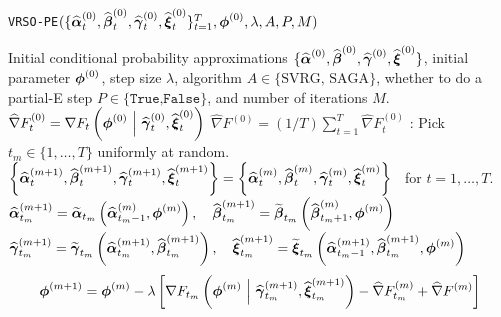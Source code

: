 \begin{algorithm}
\caption{\texttt{VRSO-PE}$(\{\widehat {\boldsymbol{\alpha}}_t^{(0)}, \widehat {\boldsymbol{\beta}}_t^{(0)}, \widehat {\boldsymbol{\gamma}}_t^{(0)}, \widehat {\boldsymbol{\xi}}_t^{(0)}\}_{t=1}^T,\boldsymbol{\phi}^{(0)},\lambda,A,P,M)$}\label{alg:VRSO-PE}
\begin{algorithmic}[1]
\Require Initial conditional probability approximations $\{\widehat {\boldsymbol{\alpha}}^{(0)}, \widehat {\boldsymbol{\beta}}^{(0)}, \widehat {\boldsymbol{\gamma}}^{(0)}, \widehat {\boldsymbol{\xi}}^{(0)}\}$, initial parameter $\boldsymbol{\phi}^{(0)}$, step size $\lambda$, algorithm $A \in \{\text{SVRG, SAGA}\}$, whether to do a partial-E step $P \in \{\texttt{True,False}\}$, and number of iterations $M$.
%
 
    \State $\widehat \nabla F^{(0)}_{t} = \nabla F_t\left(\boldsymbol{\phi}^{(0)} ~ \Big | ~ \widehat {\boldsymbol{\gamma}}^{(0)}_{t}, \widehat {\boldsymbol{\xi}}^{(0)}_{t}\right)$ 
\EndFor
\State $\widehat \nabla F^{(0)} = (1/T) \sum_{t=1}^T \widehat \nabla F^{(0)}_{t}$
%
\vspace{10pt}
%
:
    \State Pick $t_m \in \{1,\ldots,T\}$ uniformly at random.
    \vspace{10pt}
    \State $\left\{\widehat {\boldsymbol{\alpha}}^{(m+1)}_t, \widehat {\boldsymbol{\beta}}^{(m+1)}_t, \widehat {\boldsymbol{\gamma}}^{(m+1)}_t, \widehat {\boldsymbol{\xi}}^{(m+1)}_t\right\} = \left\{\widehat {\boldsymbol{\alpha}}^{(m)}_{t}, \widehat {\boldsymbol{\beta}}^{(m)}_{t}, \widehat {\boldsymbol{\gamma}}^{(m)}_{t}, \widehat {\boldsymbol{\xi}}^{(m)}_{t}\right\} \enspace$ for $t = 1,\ldots,T$.
    \vspace{5pt}
    \State $\widehat {\boldsymbol{\alpha}}_{t_m}^{(m+1)} = \widetilde {\boldsymbol{\alpha}}_{t_m}\left(\widehat {\boldsymbol{\alpha}}_{t_m-1}^{(m)},\boldsymbol{\phi}^{(m)}\right), \quad \widehat {\boldsymbol{\beta}}_{t_m}^{(m+1)} = \widetilde {\boldsymbol{\beta}}_{t_m}\left(\widehat {\boldsymbol{\beta}}_{t_m+1}^{(m)},\boldsymbol{\phi}^{(m)}\right)$ 
    \vspace{5pt}
    \State $\widehat {\boldsymbol{\gamma}}_{t_m}^{(m+1)} = \widetilde {\boldsymbol{\gamma}}_{t_m}\left(\widehat {\boldsymbol{\alpha}}_{t_m}^{(m+1)},\widehat {\boldsymbol{\beta}}_{t_m}^{(m+1)}\right), 
    \quad \widehat {\boldsymbol{\xi}}_{t_m}^{(m+1)} = \widetilde {\boldsymbol{\xi}}_{t_m}\left(\widehat {\boldsymbol{\alpha}}_{t_m-1}^{(m+1)},\widehat {\boldsymbol{\beta}}_{t_m}^{(m+1)},\boldsymbol{\phi}^{(m)}\right)$
    \EndIf
    \vspace{10pt}
    \State {}
    \begin{gather}
        \bfphi^{(m+1)} = \bfphi^{(m)} - \lambda \left[\nabla F_{t_m}\left(\bfphi^{(m)} ~ \Big | ~ \widehat \bfgamma_{t_m}^{(m+1)}, \widehat \bfxi_{t_m}^{(m+1)}\right) - \widehat \nabla F^{(m)}_{t_m} + \widehat \nabla F^{(m)} \right]

\end{gather}
\end{algorithmic}
\end{algorithm}
